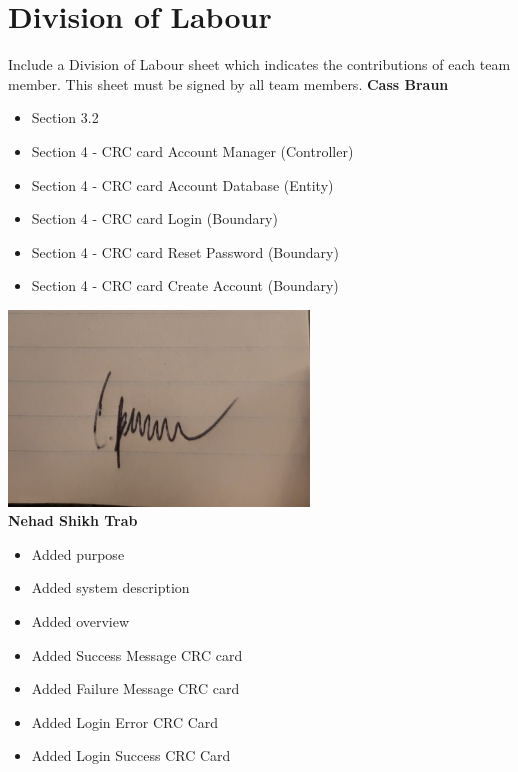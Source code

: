 \documentclass[]{article}
\begin{document}
\FloatBarrier

\appendix
\newpage
\section{Division of Labour}
\label{sec:division_of_labour}
Include a Division of Labour sheet which indicates the contributions of each team member. This sheet must be signed by all team members.
\newline
\newline
\textbf{Cass Braun}
\begin{itemize}
    \setlength\itemindent{2em}
    \item Section 3.2
    \item Section 4 - CRC card Account Manager (Controller) 
    \item Section 4 - CRC card Account Database (Entity)
    \item Section 4 - CRC card Login (Boundary)
    \item Section 4 - CRC card Reset Password (Boundary) 
    \item Section 4 - CRC card Create Account (Boundary) \end{itemize} 
\includegraphics[width=0.6\textwidth]{Cass.jpg}
\\
\textbf{Nehad Shikh Trab}
\begin{itemize}
    \setlength\itemindent{2em}
\item Added purpose
\item Added system description
\item Added overview
\item Added Success Message CRC card
\item Added Failure Message CRC card
\item Added Login Error CRC Card
\item Added Login Success CRC Card
\end{itemize}
\end{document}

